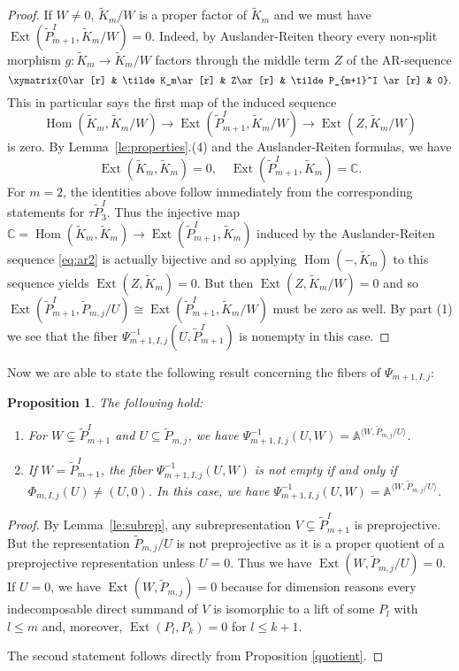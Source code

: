 \documentclass{amsart}
\newtheorem{proposition}[theorem]{Proposition}
\numberwithin{equation}{section}
\renewcommand{\AA}{\mathbb{A}}
\newcommand{\CC}{\mathbb{C}}
\newcommand{\Ext}{\operatorname{Ext}}
\newcommand{\Hom}{\operatorname{Hom}}
\newcommand{\ses}[3]{\xymatrix{0\ar[r] & #1\ar[r] & #2\ar[r] & #3 \ar[r] & 0}}
\begin{document}
\begin{proof}
  If $W\neq 0$, $\tilde K_m/W$ is a proper factor of $\tilde K_m$ and we must have $\Ext(\tilde P_{m+1}^I,\tilde K_m/W)=0$.
  Indeed, by Auslander-Reiten theory every non-split morphism $g:\tilde K_m\to\tilde K_m/W$ factors through the middle term $Z$ of the AR-sequence 
  \begin{equation}
    \label{eq:ar2}
    \ses{\tilde K_m}{Z}{\tilde P_{m+1}^I}.
  \end{equation}
  This in particular says the first map of the induced sequence
  \[\Hom(\tilde K_m,\tilde K_m/W)\to\Ext(\tilde P_{m+1}^I,\tilde K_m/W)\to\Ext(Z,\tilde K_m/W)\]
  is zero.
  By Lemma~\ref{le:properties}.(4) and the Auslander-Reiten formulas, we have 
  \[\Ext(\tilde K_m,\tilde K_m)=0,\quad \Ext(\tilde P_{m+1}^I,\tilde K_m)=\CC.\]
  For $m=2$, the identities above follow immediately from the corresponding statements for $\tau\tilde P_3^I$.
  Thus the injective map $\CC=\Hom(\tilde K_m,\tilde K_m)\to\Ext(\tilde P_{m+1}^I,\tilde K_m)$ induced by the Auslander-Reiten sequence \eqref{eq:ar2} is actually bijective and so applying $\Hom(-,\tilde K_m)$ to this sequence yields $\Ext(Z,\tilde K_m)=0$.
  But then $\Ext(Z,\tilde K_m/W)=0$ and so $\Ext(\tilde P_{m+1}^I,\tilde P_{m,j}/U)\cong\Ext(\tilde P_{m+1}^I,\tilde K_m/W)$ must be zero as well.
  By part (1) we see that the fiber $\Psi_{m+1,I,j}^{-1}(U,\tilde P_{m+1}^I)$ is nonempty in this case.
\end{proof}

Now we are able to state the following result concerning the fibers of $\Psi_{m+1,I,j}$:
\begin{proposition}
  \label{fibers}
  The following hold:
  \begin{enumerate}
    \item For $W\subsetneq\tilde P_{m+1}^I$ and $U\subseteq\tilde P_{m,j}$, we have $\Psi_{m+1,I,j}^{-1}(U,W)=\AA^{\langle W,\tilde P_{m,j}/U\rangle}$.
    \item If $W=\tilde P_{m+1}^I$, the fiber $\Psi_{m+1,I,j}^{-1}(U,W)$ is not empty if and only if $\Phi_{m,I,j}(U)\neq(U,0)$.
      In this case, we have $\Psi_{m+1,I,j}^{-1}(U,W)=\AA^{\langle W,\tilde P_{m,j}/U\rangle}$.
  \end{enumerate}
\end{proposition}
\begin{proof}
  By Lemma~\ref{le:subrep}, any subrepresentation $V\subsetneq\tilde P_{m+1}^I$ is preprojective.
  But the representation $\tilde P_{m,j}/U$ is not preprojective as it is a proper quotient of a preprojective representation unless $U=0$.
  Thus we have $\Ext(W,\tilde P_{m,j}/U)=0$. 
  If $U=0$, we have $\Ext(W,\tilde P_{m,j})=0$ because for dimension reasons every indecomposable direct summand of $V$ is isomorphic to a lift of some $P_l$ with $l\leq m$ and, moreover, $\Ext(P_l,P_k)=0$ for $l\leq k+1$.

  The second statement follows directly from Proposition \ref{quotient}.
\end{proof}
\end{document}
